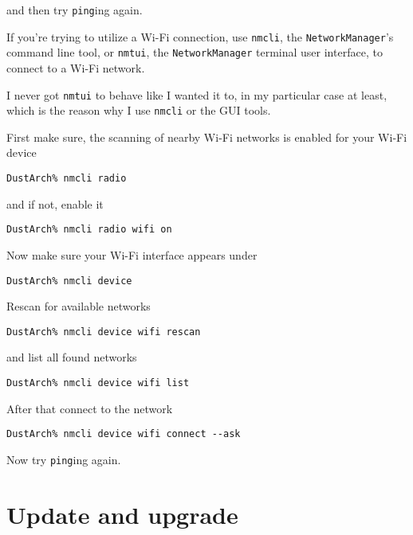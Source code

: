 \documentclass[10pt]{dustdoc}
\begin{document}
\noindent
and then try \texttt{ping}ing again.

If you're trying to utilize a Wi-Fi connection, use \texttt{nmcli}, the \texttt{NetworkManager}'s command line tool, or \texttt{nmtui}, the \texttt{NetworkManager} terminal user interface, to connect to a Wi-Fi network.

\begin{NOTE}
    I never got \texttt{nmtui} to behave like I wanted it to, in my particular case at least, which is the reason why I use \texttt{nmcli} or the GUI tools.
\end{NOTE}

First make sure, the scanning of nearby Wi-Fi networks is enabled for your Wi-Fi device

\begin{verbatim}
DustArch% nmcli radio
\end{verbatim}

\noindent
and if not, enable it

\begin{verbatim}
DustArch% nmcli radio wifi on
\end{verbatim}

Now make sure your Wi-Fi interface appears under

\begin{verbatim}
DustArch% nmcli device
\end{verbatim}

Rescan for available networks

\begin{verbatim}
DustArch% nmcli device wifi rescan
\end{verbatim}

\noindent
and list all found networks

\begin{verbatim}
DustArch% nmcli device wifi list
\end{verbatim}

After that connect to the network

\begin{verbatim}
DustArch% nmcli device wifi connect --ask
\end{verbatim}

Now try \texttt{ping}ing again.

\section{Update and upgrade}
\label{sec:update-and-upgrade}
\end{document}

